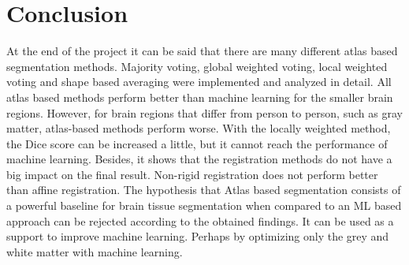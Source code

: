 \section*{Conclusion}
At the end of the project it can be said that there are many different atlas based segmentation methods. Majority voting, global weighted voting, local weighted voting and shape based averaging were implemented and analyzed in detail. All atlas based methods perform better than machine learning for the smaller brain regions. However, for brain regions that differ from person to person, such as gray matter, atlas-based methods perform worse. With the locally weighted method, the Dice score can be increased a little, but it cannot reach the performance of machine learning. Besides, it shows that the registration methods do not have a big impact on the final result. Non-rigid registration does not perform better than affine registration. The hypothesis that Atlas based segmentation consists of a powerful baseline for brain tissue segmentation when compared to an ML based approach can be rejected according to the obtained findings. It can be used as a support to improve machine learning. Perhaps by optimizing only the grey and white matter with machine learning.